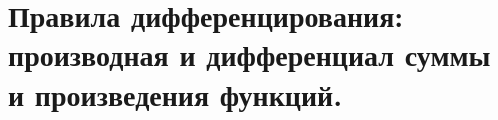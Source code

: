 \section{Правила дифференцирования: производная и дифференциал суммы и произведения функций.}

\pagebreak